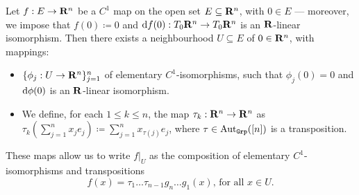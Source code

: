 \begin{proposition}
    \label{prop:decomposition-elementary-C1}
    Let \(f: E \to \mathbf{R}^n\) be a \(C^1\) map on the open set \(E \subseteq \mathbf{R}^n\),
    with \(0 \in E\) --- moreover, we impose that \(f(0) \coloneq 0\) and \(\mathrm{d}
    f(0): T_0\mathbf{R}^n \to T_0\mathbf{R}^n\) is an \(\mathbf{R}\)-linear isomorphism. Then there exists a
    neighbourhood \(U \subseteq E\) of \(0 \in \mathbf{R}^n\), with mappings:
    \begin{itemize}\setlength\itemsep{0em}
        \item \(\{\phi_{j}: U \to \mathbf{R}^n\}_{j=1}^n\) of elementary \(C^1\)-isomorphisms,
              such that \(\phi_j(0) = 0\) and \(\mathrm{d} \phi(0)\) is an \(\mathbf{R}\)-linear
              isomorphism.
        \item We define, for each \(1 \leq k \leq n\), the map \(\tau_k: \mathbf{R}^n \to \mathbf{R}^n\)
              as \(\tau_k(\sum_{j=1}^n x_j e_j) \coloneq \sum_{j=1}^n x_{\tau(j)} e_{j}\),
              where \(\tau \in \operatorname{Aut}_{{\texttt{Grp}}}([n])\) is a transposition.
    \end{itemize}
    These maps allow us to write \(f|_U\) as the composition of elementary
    \(C^1\)-isomorphisms and transpositions
    \[
        f(x) = \tau_1 \dots \tau_{n-1} g_n \dots g_1(x)\text{, for all } x \in U.
    \]
\end{proposition}

